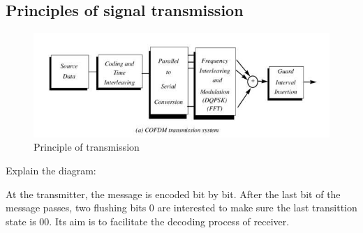 \documentclass[a4paper]{report}
\begin{document}
    \subsection{Principles of signal transmission}
        \begin{figure}[ht]
            \centering
            \includegraphics[width=\linewidth]{transmitter.jpg}
            \caption{\label{fig:boat}Principle of transmission}
        \end{figure}
        \newpage
        Explain the diagram: 
        \linebreak
        \par At the transmitter, the message is encoded bit by bit. After the last bit of the message passes, 
        two flushing bits 0 are interested to make sure the last transittion state is 00. Its aim is 
        to facilitate the decoding process of receiver. 
        \linebreak
\end{document}
